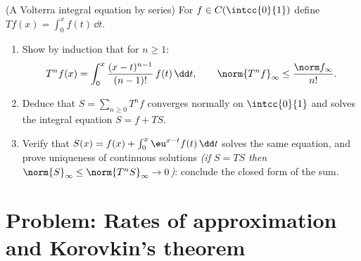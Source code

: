 \begin{exercise}[$\star\star\star$]\label{exo:b2:funcseq:12}
(A Volterra integral equation by series) For $f \in
C(\intcc{0}{1})$ define $Tf(x) = \int_0^x f(t)\,\dd t$.
\begin{enumerate}
  \item Show by induction that for $n \geq 1$:
        \[
        T^n f(x) = \int_0^x \frac{(x -
        t)^{n-1}}{(n-1)!}\,f(t)\,\dd t,
        \qquad
        \norm{T^n f}_\infty \leq \frac{\norm f_\infty}{n!} .
        \]
  \item Deduce that $S = \sum_{n\geq0} T^n f$ converges normally
        on $\intcc{0}{1}$ and solves the integral equation $S = f
        + TS$.
  \item Verify that $S(x) = f(x) + \int_0^x \eu^{x-t}f(t)\,\dd
        t$ solves the same equation, and prove uniqueness of
        continuous solutions \emph{(if $S = TS$ then
        $\norm{S}_\infty \leq \norm{T^nS}_\infty \to 0$)}:
        conclude the closed form of the sum.
\end{enumerate}
\end{exercise}

\section{Problem: Rates of approximation and Korovkin's theorem}

